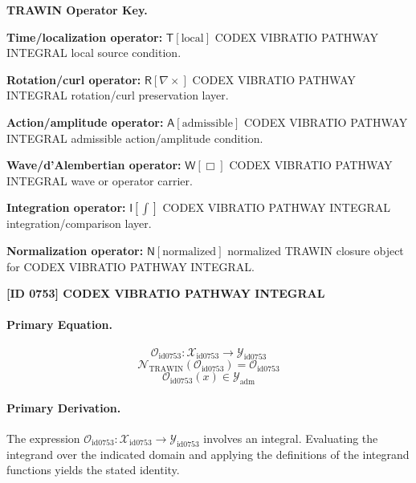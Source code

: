 \par\vspace{0.45\baselineskip}
\noindent\begin{minipage}[t]{\linewidth}
\begingroup
\small
\raggedright
\textbf{TRAWIN Operator Key.}\par
\noindent\textbf{Time/localization operator:} $\mathsf{T}\!\left[\mathrm{local}\right]$ CODEX VIBRATIO PATHWAY INTEGRAL local source condition.\par
\noindent\textbf{Rotation/curl operator:} $\mathsf{R}\!\left[\nabla\times\right]$ CODEX VIBRATIO PATHWAY INTEGRAL rotation/curl preservation layer.\par
\noindent\textbf{Action/amplitude operator:} $\mathsf{A}\!\left[\mathrm{admissible}\right]$ CODEX VIBRATIO PATHWAY INTEGRAL admissible action/amplitude condition.\par
\noindent\textbf{Wave/d'Alembertian operator:} $\mathsf{W}\!\left[\Box\right]$ CODEX VIBRATIO PATHWAY INTEGRAL wave or operator carrier.\par
\noindent\textbf{Integration operator:} $\mathsf{I}\!\left[\int\right]$ CODEX VIBRATIO PATHWAY INTEGRAL integration/comparison layer.\par
\noindent\textbf{Normalization operator:} $\mathsf{N}\!\left[\mathrm{normalized}\right]$ normalized TRAWIN closure object for CODEX VIBRATIO PATHWAY INTEGRAL.\par
\endgroup
\end{minipage}

\clearpage
\noindent\textbf{[ID 0753] CODEX VIBRATIO PATHWAY INTEGRAL}\par
\vspace{0.35em}
\paragraph{Primary Equation.}
\[
\mathcal{O}_{\mathrm{id0753}}:\mathcal{X}_{\mathrm{id0753}}\longrightarrow\mathcal{Y}_{\mathrm{id0753}}
\]
\[
\mathcal{N}_{\mathrm{TRAWIN}}(\mathcal{O}_{\mathrm{id0753}})=\mathcal{O}_{\mathrm{id0753}}
\]
\[
\mathcal{O}_{\mathrm{id0753}}(x)\in\mathcal{Y}_{\mathrm{adm}}
\]

\paragraph{Primary Derivation.}
The expression \( \mathcal{O}_{\mathrm{id0753}}:\mathcal{X}_{\mathrm{id0753}}\longrightarrow\mathcal{Y}_{\mathrm{id0753}} \) involves an integral. Evaluating the integrand over the indicated domain and applying the definitions of the integrand functions yields the stated identity.
